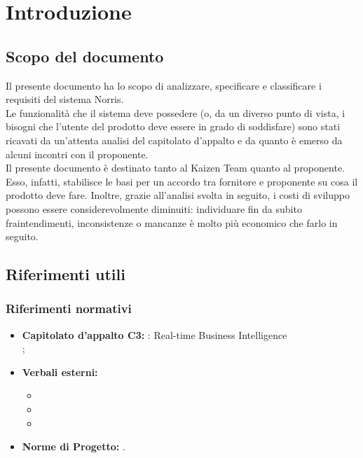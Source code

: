 \section{Introduzione}

	\subsection{Scopo del documento}
		Il presente documento ha lo scopo di analizzare, specificare e classificare i requisiti del sistema Norris.\\
		Le funzionalità che il sistema deve possedere (o, da un diverso punto di vista, i bisogni che l'utente del prodotto deve essere in grado di soddisfare) sono stati ricavati da un'attenta analisi del capitolato d'appalto e da quanto è emerso da alcuni incontri con il proponente.\\
		Il presente documento è destinato tanto al Kaizen Team quanto al proponente. Esso, infatti, stabilisce le basi per un accordo tra fornitore e proponente su cosa il prodotto deve fare. Inoltre, grazie all'analisi svolta in seguito, i costi di sviluppo possono essere considerevolmente diminuiti: individuare fin da subito fraintendimenti, inconsistenze o mancanze è molto più economico che farlo in seguito.
	
	

	\subsection{Riferimenti utili}
		\subsubsection{Riferimenti normativi}
		\begin{itemize}
			\item\textbf{Capitolato d'appalto C3:} \projectname{}: Real-time Business Intelligence \\
				;
			\item \textbf{Verbali esterni:}
				\begin{itemize}
					\item {}
					\item {}
					\item {}
				\end{itemize}
			\item \textbf{Norme di Progetto:} .
		\end{itemize}
